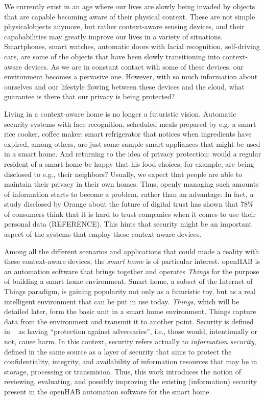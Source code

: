 \documentclass[12pt]{article}
\newcommand{\TODO}{\todo[inline]}
\begin{document}
\TODO{(ref) references}
\TODO{Motivation on going from state of the art to OH2}

We currently exist in an age where our lives are slowly being invaded by objects that are capable becoming aware of their physical context. These are not simple physicalobjects anymore, but rather context-aware sensing devices, and their capababilities may greatly improve our lives in a variety of situations. Smartphones, smart watches, automatic doors with facial recognition, self-driving cars, are some of the objects that have been slowly transitioning into context-aware devices. As we are in constant contact with some of these devices, our environment becomes a pervasive one. However, with so much information about ourselves and our lifestyle flowing between these devices and the cloud, what guarantee is there that our privacy is being protected?

Living in a context-aware home is no longer a futuristic vision. Automatic security systems with face recognition, scheduled meals prepared by e.g. a smart rice cooker, coffee maker; smart refrigerator that notices when ingredients have expired, among others, are just some sample smart appliances that might be used in a smart home. And returning to the idea of privacy protection: would a regular resident of a smart home be happy that his food choices, for example, are being disclosed to e.g., their neighbors? Usually, we expect that people are able to maintain their privacy in their own homes. Thus, openly managing such amounts of information starts to become a problem, rather than an advantage. In fact, a study disclosed by Orange about the future of digital trust has shown that 78\% of consumers think that it is hard to trust companies when it comes to use their personal data (REFERENCE). This hints that security might be an important aspect of the systems that employ these context-aware devices. 

Among all the different scenarios and applications that could made a reality with these context-aware devices, the \emph{smart home} is of particular interest. openHAB is an automation software that brings together and operates \emph{Things} for the purpose of building a smart home environment. Smart home, a subset of the Internet of Things paradigm, is gaining popularity not only as a futuristic toy, but as a real intelligent environment that can be put in use today. \emph{Things}, which will be detailed later, form the basic unit in a smart home environment. Things capture data from the environment and transmit it to another point. Security is defined in ~\cite{whitman2011principles} as having ``protection against adversaries'', i.e., those would, intentionally or not, cause harm. In this context, security refers actually to \emph{information security}, defined in the same source as a layer of security that aims to protect the confidentiality, integrity, and availability of information resources that may be in storage, processing or transmision. Thus, this work introduces the notion of reviewing, evaluating, and possibly improving the existing (information) security present in the openHAB automation software for the smart home.
\end{document}
